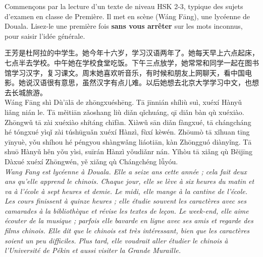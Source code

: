 \documentclass[11pt]{article}
\newcommand{\zh}[1]{\ifmmode\text{#1}\else{#1}\fi}
\begin{document}
Commençons par la lecture d'un texte de niveau HSK 2-3, typique des sujets d'examen en classe de Première. Il met en scène \zh{王芳} (Wáng Fāng), une lycéenne de Douala. Lisez-le une première fois \textbf{sans vous arrêter} sur les mots inconnus, pour saisir l'idée générale.

\begin{textebox}
王芳是杜阿拉的中学生。她今年十六岁，学习汉语两年了。她每天早上六点起床，七点半去学校。中午她在学校食堂吃饭。下午三点放学，她常常和同学一起在图书馆学习汉字，复习课文。周末她喜欢听音乐，有时候和朋友上网聊天，看中国电影。她说汉语很有意思，虽然汉字有点儿难。以后她想去北京大学学习中文，也想去长城旅游。\\
Wáng Fāng shì Dù'ālā de zhōngxuéshēng. Tā jīnnián shíliù suì, xuéxí Hànyǔ liǎng nián le. Tā měitiān zǎoshang liù diǎn qǐchuáng, qī diǎn bàn qù xuéxiào. Zhōngwǔ tā zài xuéxiào shítáng chīfàn. Xiàwǔ sān diǎn fàngxué, tā chángcháng hé tóngxué yìqǐ zài túshūguǎn xuéxí Hànzì, fùxí kèwén. Zhōumò tā xǐhuan tīng yīnyuè, yǒu shíhou hé péngyou shàngwǎng liáotiān, kàn Zhōngguó diànyǐng. Tā shuō Hànyǔ hěn yǒu yìsi, suīrán Hànzì yǒudiǎnr nán. Yǐhòu tā xiǎng qù Běijīng Dàxué xuéxí Zhōngwén, yě xiǎng qù Chángchéng lǚyóu.\\
\emph{Wang Fang est lycéenne à Douala. Elle a seize ans cette année ; cela fait deux ans qu'elle apprend le chinois. Chaque jour, elle se lève à six heures du matin et va à l'école à sept heures et demie. Le midi, elle mange à la cantine de l'école. Les cours finissent à quinze heures ; elle étudie souvent les caractères avec ses camarades à la bibliothèque et révise les textes de leçon. Le week-end, elle aime écouter de la musique ; parfois elle bavarde en ligne avec ses amis et regarde des films chinois. Elle dit que le chinois est très intéressant, bien que les caractères soient un peu difficiles. Plus tard, elle voudrait aller étudier le chinois à l'Université de Pékin et aussi visiter la Grande Muraille.}
\end{textebox}
\end{document}
